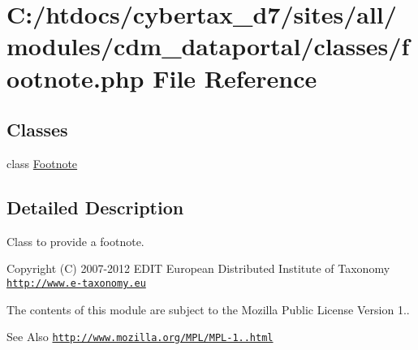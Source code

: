 \hypertarget{footnote_8php}{\section{C\-:/htdocs/cybertax\-\_\-d7/sites/all/modules/cdm\-\_\-dataportal/classes/footnote.php File Reference}
\label{footnote_8php}
}
\subsection*{Classes}
\begin{DoxyCompactItemize}
\item 
class \hyperlink{class_footnote}{Footnote}
\end{DoxyCompactItemize}


\subsection{Detailed Description}
Class to provide a footnote.

\begin{DoxyCopyright}{Copyright}
(C) 2007-\/2012 E\-D\-I\-T European Distributed Institute of Taxonomy \href{http://www.e-taxonomy.eu}{\tt http\-://www.\-e-\/taxonomy.\-eu}
\end{DoxyCopyright}
The contents of this module are subject to the Mozilla Public License Version 1.. \begin{DoxySeeAlso}{See Also}
\href{http://www.mozilla.org/MPL/MPL-1.1.html}{\tt http\-://www.\-mozilla.\-org/\-M\-P\-L/\-M\-P\-L-\/1..\-html} 
\end{DoxySeeAlso}
